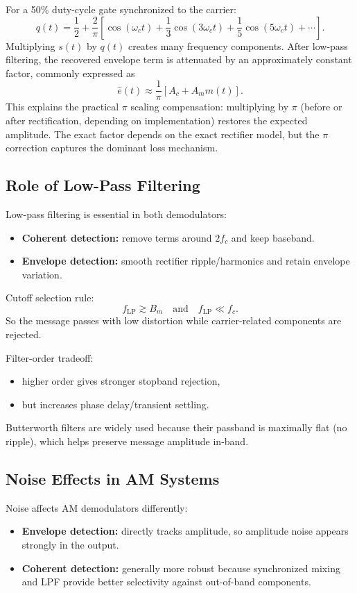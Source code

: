 For a 50\% duty-cycle gate synchronized to the carrier:
\begin{equation}
q(t)=\frac{1}{2}+\frac{2}{\pi}\!\left[\cos(\omega_c t)+\frac{1}{3}\cos(3\omega_c t)+\frac{1}{5}\cos(5\omega_c t)+\cdots\right].
\label{eq:gate_series}
\end{equation}
Multiplying $s(t)$ by $q(t)$ creates many frequency components. After low-pass filtering, the recovered envelope term is attenuated by an approximately constant factor, commonly expressed as
\begin{equation}
\hat{e}(t)\approx \frac{1}{\pi}\left[A_c + A_m m(t)\right].
\label{eq:pi_loss}
\end{equation}
This explains the practical $\pi$ scaling compensation: multiplying by $\pi$ (before or after rectification, depending on implementation) restores the expected amplitude. The exact factor depends on the exact rectifier model, but the $\pi$ correction captures the dominant loss mechanism.

\subsection{Role of Low-Pass Filtering}
Low-pass filtering is essential in both demodulators:
\begin{itemize}
\item \textbf{Coherent detection:} remove terms around $2f_c$ and keep baseband.
\item \textbf{Envelope detection:} smooth rectifier ripple/harmonics and retain envelope variation.
\end{itemize}

Cutoff selection rule:
\begin{equation}
f_{\mathrm{LP}} \gtrsim B_m \quad \text{and} \quad f_{\mathrm{LP}} \ll f_c.
\end{equation}
So the message passes with low distortion while carrier-related components are rejected.

Filter-order tradeoff:
\begin{itemize}
\item higher order gives stronger stopband rejection,
\item but increases phase delay/transient settling.
\end{itemize}
Butterworth filters are widely used because their passband is maximally flat (no ripple), which helps preserve message amplitude in-band.

\subsection{Noise Effects in AM Systems}
Noise affects AM demodulators differently:
\begin{itemize}
\item \textbf{Envelope detection:} directly tracks amplitude, so amplitude noise appears strongly in the output.
\item \textbf{Coherent detection:} generally more robust because synchronized mixing and LPF provide better selectivity against out-of-band components.
\end{itemize}


